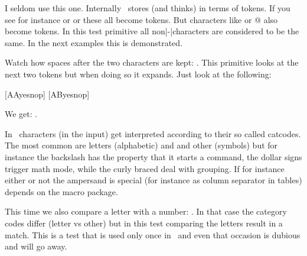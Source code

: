 \stopsubsection

\stopsection

\startsection[title={\TEX\ primitives}]

\startsubsection[title={\tex{if}}]

I seldom use this one. Internally \TEX\ stores (and thinks) in terms of tokens.
If you see for instance \type {\def} or \type {\dimen} or \type {\hbox} these all
become tokens. But characters like  or {@} also become tokens. In this
test primitive all non|-|characters are considered to be the same. In the next
examples this is demonstrated.

\stopbuffer

\typebuffer[option=TEX]

Watch how spaces after the two characters are kept: \inlinebuffer . This primitive looks
at the next two tokens but when doing so it expands. Just look at the following:

\startbuffer
\def\AA{AA}%
\def\AB{AB}%
[\if\AA yes\else nop\fi]
[\if\AB yes\else nop\fi]
\stopbuffer

\typebuffer[option=TEX]

We get: \inlinebuffer .


\stopsubsection

\startsubsection[title={\tex{ifcat}}]

In \TEX\ characters (in the input) get interpreted according to their so called
catcodes. The most common are letters (alphabetic) and and other (symbols) but
for instance the backslash has the property that it starts a command, the dollar
signs trigger math mode, while the curly braced deal with grouping. If for
instance either or not the ampersand is special (for instance as column separator
in tables) depends on the macro package.

\stopbuffer

\typebuffer[option=TEX]

This time we also compare a letter with a number: \inlinebuffer . In that case
the category codes differ (letter vs other) but in this test comparing the
letters result in a match. This is a test that is used only once in \CONTEXT\ and
even that occasion is dubious and will go away.

